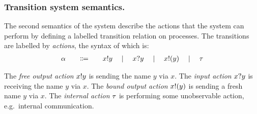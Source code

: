 \documentclass[runningheads]{llncs}
\begin{document}
\subsubsection{Transition system semantics.}
The second semantics of the system describe the actions that the system can perform by defining a labelled transition relation on processes.
The transitions are labelled by \emph{actions}, the syntax of which is:
\[
\begin{array}{r@{\qquad}c@{\qquad}l}
  \alpha & \Coloneqq & \Aoutf{x}{y} \quad\mid\quad \Ain{x}{y} \quad\mid\quad \Aoutb{x}{y} \quad\mid\quad \Atau
\end{array}
\]

The \emph{free output action} \( x ! y \) is sending the name \( y \) via \( x \).
The \emph{input action} \( x ? y \) is receiving the name \( y \) via \( x \).
The \emph{bound output action} \( x ! (y) \) is sending a fresh name \( y \) via \( x \).
The \emph{internal action} \( \tau \) is performing some unobservable action, e.g.\ internal communication.
\end{document}
